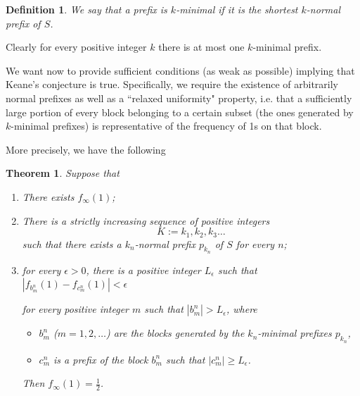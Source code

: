 \documentclass[10pt,a4paper]{article}
\newtheorem{theorem}{Theorem}
\newtheorem{rem}{Remark}
\newtheorem{defi}{Definition}
\begin{document}
\begin{defi}
We say that a prefix is $k$-\emph{minimal} if it is the shortest $k$-normal prefix of $S$.
\end{defi}
 Clearly for every positive integer $k$ there is at most one $k$-minimal prefix.

We want now to provide sufficient conditions (as weak as possible) implying that Keane's conjecture is true. Specifically, we require the existence of arbitrarily normal prefixes as well as a ``relaxed uniformity" property, i.e. that a sufficiently large portion of every block belonging to a certain subset (the ones generated by $k$-minimal prefixes) is representative of the frequency of 1s on that block. 

More precisely, we have the following

\begin{theorem}
Suppose that
\begin{enumerate}
\item There exists $f_{\infty}(1)$; 
\item There is a strictly increasing sequence of positive integers $$K:=k_1,k_2,k_3\dots$$ such that there exists a $k_n$-normal prefix $p_{k_n}$ of $S$ for every $n$;
\item for every $\epsilon>0$, there is a positive integer $L_\epsilon$ such that $|f_{b_{m}^n}(1)-f_{c_{m}^n}(1)|<\epsilon$ 

for every positive integer $m$ such that $|b_m^n|>L_\epsilon$, where
\begin{itemize}
\item $b_{m}^n$ ($m=1,2,\dots$) are the blocks generated by the $k_n$-minimal prefixes $p_{k_n}$,
\item $c_{m}^n$ is a prefix of the block $b_{m}^n$ such that $|c_{m}^n|\ge L_\epsilon$. 
\end{itemize}

\vspace{0.2cm}

Then $f_{\infty}(1)=\frac{1}{2}$.
\end{enumerate}

\end{theorem}
\end{document}
